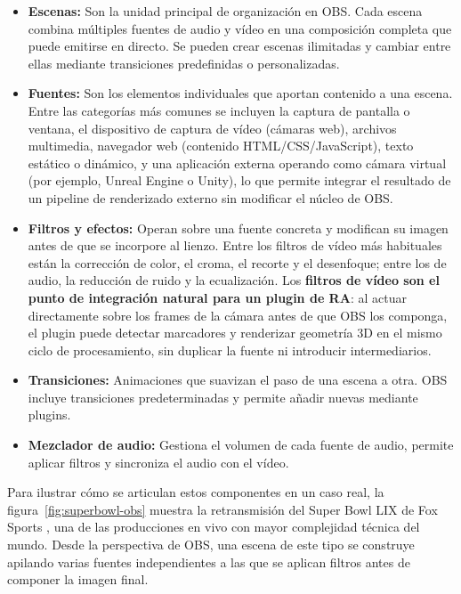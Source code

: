 \begin{itemize}
    \item \textbf{Escenas:} Son la unidad principal de organización en OBS. Cada escena combina múltiples fuentes de audio y vídeo en una composición completa que puede emitirse en directo. Se pueden crear escenas ilimitadas y cambiar entre ellas mediante transiciones predefinidas o personalizadas.

    \item \textbf{Fuentes:} Son los elementos individuales que aportan contenido a una escena. Entre las categorías más comunes se incluyen la captura de pantalla o ventana, el dispositivo de captura de vídeo (cámaras web), archivos multimedia, navegador web (contenido HTML/CSS/JavaScript), texto estático o dinámico, y una aplicación externa operando como cámara virtual (por ejemplo, Unreal Engine o Unity), lo que permite integrar el resultado de un pipeline de renderizado externo sin modificar el núcleo de OBS.

    \item \textbf{Filtros y efectos:} Operan sobre una fuente concreta y modifican su imagen antes de que se incorpore al lienzo. Entre los filtros de vídeo más habituales están la corrección de color, el croma, el recorte y el desenfoque; entre los de audio, la reducción de ruido y la ecualización. Los \textbf{filtros de vídeo son el punto de integración natural para un plugin de RA}: al actuar directamente sobre los frames de la cámara antes de que OBS los componga, el plugin puede detectar marcadores y renderizar geometría 3D en el mismo ciclo de procesamiento, sin duplicar la fuente ni introducir intermediarios.

    \item \textbf{Transiciones:} Animaciones que suavizan el paso de una escena a otra. OBS incluye transiciones predeterminadas y permite añadir nuevas mediante plugins.

    \item \textbf{Mezclador de audio:} Gestiona el volumen de cada fuente de audio, permite aplicar filtros y sincroniza el audio con el vídeo.
\end{itemize}

Para ilustrar cómo se articulan estos componentes en un caso real, la figura~\ref{fig:superbowl-obs} muestra la retransmisión del Super Bowl LIX de Fox Sports \citep{SportsVideo2025}, una de las producciones en vivo con mayor complejidad técnica del mundo. Desde la perspectiva de OBS, una escena de este tipo se construye apilando varias fuentes independientes a las que se aplican filtros antes de componer la imagen final.

